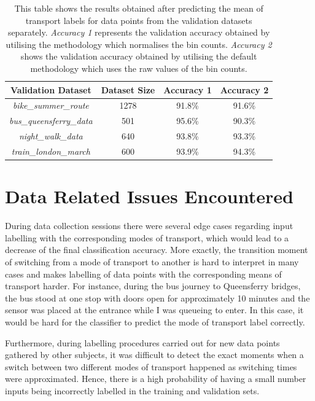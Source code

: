 \documentclass[bsc,frontabs,twoside,singlespacing, parskip,deptreport]{infthesis}     %
\begin{document}
\begin{table}[h!]
\centering
 \begin{tabular}{|| c | c | c | c ||} 
 \hline
 Validation Dataset & Dataset Size & Accuracy 1 & Accuracy 2 \\ [0.5ex] 
 \hline\hline
 \textit{bike\_summer\_route} & 1278 &  91.8\% & 91.6\% \\ 
 \hline
 \textit{bus\_queensferry\_data} & 501 & 95.6\% & 90.3\% \\ 
 \hline
 \textit{night\_walk\_data} & 640 & 93.8\% & 93.3\% \\
 \hline
 \textit{train\_london\_march} & 600 & 93.9\% & 94.3\% \\ 
 \hline
\end{tabular}
\caption{This table shows the results obtained after predicting the mean of transport labels for data points from the validation datasets separately. \textit{Accuracy 1} represents the validation accuracy obtained by utilising the methodology which normalises the bin counts. \textit{Accuracy 2} shows the validation accuracy obtained by utilising the default methodology which uses the raw values of the bin counts.}
\label{table:validation-results}
\end{table}

\section{Data Related Issues Encountered}

During data collection sessions there were several edge cases regarding input labelling with the corresponding modes of transport, which would lead to a decrease of the final classification accuracy. More exactly, the transition moment of switching from a mode of transport to another is hard to interpret in many cases and makes labelling of data points with the corresponding means of transport harder. For instance, during the bus journey to Queensferry bridges, the bus stood at one stop with doors open for approximately 10 minutes and the sensor was placed at the entrance while I was queueing to enter. In this case, it would be hard for the classifier to predict the mode of transport label correctly. 

Furthermore, during labelling procedures carried out for new data points gathered by other subjects, it was difficult to detect the exact moments when a switch between two different modes of transport happened as switching times were approximated. Hence, there is a high probability of having a small number inputs being incorrectly labelled in the training and validation sets.
\end{document}
